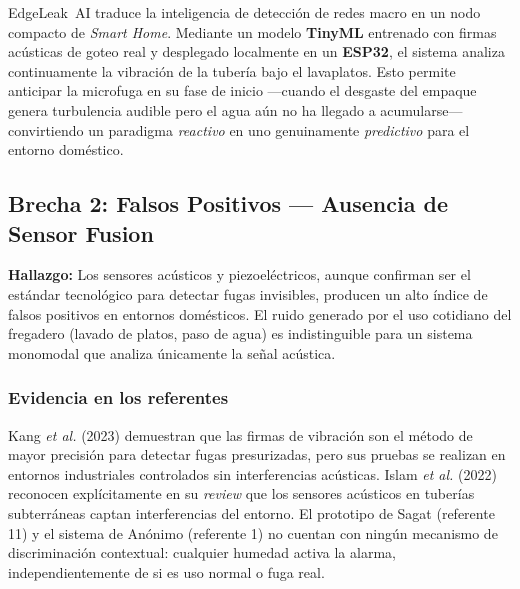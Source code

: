 \documentclass[12pt,a4paper]{article}
\begin{document}
EdgeLeak~AI traduce la inteligencia de detección de redes macro en un nodo compacto de
\textit{Smart Home}. Mediante un modelo \textbf{TinyML} entrenado con firmas acústicas
de goteo real y desplegado localmente en un \textbf{ESP32}, el sistema analiza
continuamente la vibración de la tubería bajo el lavaplatos. Esto permite anticipar la
microfuga en su fase de inicio ---cuando el desgaste del empaque genera turbulencia
audible pero el agua aún no ha llegado a acumularse--- convirtiendo un paradigma
\textit{reactivo} en uno genuinamente \textit{predictivo} para el entorno doméstico.

\subsection{Brecha 2: Falsos Positivos --- Ausencia de Sensor Fusion}

\begin{mdframed}[linecolor=warningorange,linewidth=1pt,backgroundcolor=orange!3]
\textbf{Hallazgo:} Los sensores acústicos y piezoeléctricos, aunque confirman ser el
estándar tecnológico para detectar fugas invisibles, producen un alto índice de
falsos positivos en entornos domésticos. El ruido generado por el uso cotidiano del
fregadero (lavado de platos, paso de agua) es indistinguible para un sistema monomodal
que analiza únicamente la señal acústica.
\end{mdframed}

\vspace{0.6em}

\subsubsection{Evidencia en los referentes}

Kang \textit{et al.} (2023) demuestran que las firmas de vibración son el método de
mayor precisión para detectar fugas presurizadas, pero sus pruebas se realizan en
entornos industriales controlados sin interferencias acústicas. Islam \textit{et al.}
(2022) reconocen explícitamente en su \textit{review} que los sensores acústicos en
tuberías subterráneas captan interferencias del entorno. El prototipo de Sagat (referente
11) y el sistema de Anónimo (referente 1) no cuentan con ningún mecanismo de
discriminación contextual: cualquier humedad activa la alarma, independientemente de
si es uso normal o fuga real.
\end{document}
